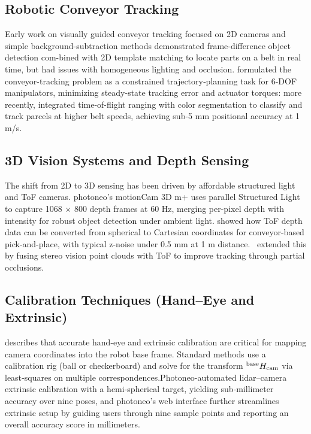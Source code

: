 \documentclass[12pt]{article}
\begin{document}
\subsection{Robotic Conveyor Tracking}
Early work on visually guided conveyor tracking focused on 2D cameras and simple background-subtraction methods\cite{ref12} demonstrated frame-difference object detection com-bined with 2D template matching to locate parts on a belt in real time, but had issues with homogeneous lighting and occlusion.\cite{ref14} formulated the conveyor-tracking problem as a constrained trajectory‐planning task for 6-DOF manipulators, minimizing steady-state tracking error and actuator torques: more recently,\cite{ref9} integrated time-of-flight ranging with color segmentation to classify and track parcels at higher belt speeds, achieving sub-5 mm positional accuracy at 1 m/s.\\

\subsection{3D Vision Systems and Depth Sensing}
The shift from 2D to 3D sensing has been driven by affordable structured light and ToF cameras\cite{ref2}. photoneo’s motionCam 3D m+ uses parallel Structured Light to capture 1068 × 800 depth frames at 60 Hz, merging per-pixel depth with intensity for robust object detection under ambient light. \cite{ref17} showed how ToF depth data can be converted from spherical to Cartesian coordinates for conveyor-based pick-and-place, with typical z-noise under 0.5 mm at 1 m distance.\ \cite{ref3} extended this by fusing stereo vision point clouds with ToF to improve tracking through partial occlusions.\\


\subsection{Calibration Techniques (Hand–Eye and Extrinsic)}
\cite{ref3} describes that accurate hand-eye and extrinsic calibration are critical for mapping camera coordinates into the robot base frame. Standard methods use a calibration rig (ball or checkerboard) and solve for the transform ${}^{\rm base}H_{\rm cam}$ via least‐squares on multiple correspondences\cite{ref2}.Photoneo-automated lidar–camera extrinsic calibration with a hemi-spherical target, yielding sub‐millimeter accuracy over nine poses, and photoneo’s web interface further streamlines extrinsic setup by guiding users through nine sample points and reporting an overall accuracy score in millimeters.
\end{document}
